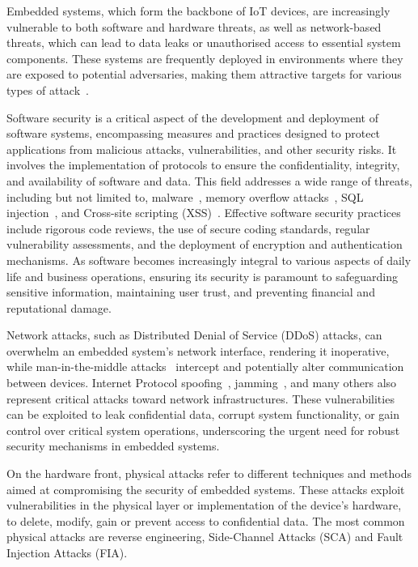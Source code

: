 Embedded systems, which form the backbone of IoT devices, are increasingly vulnerable to both software and hardware threats, as well as network-based threats, which can lead to data leaks or unauthorised access to essential system components. These systems are frequently deployed in environments where they are exposed to potential adversaries, making them attractive targets for various types of attack~\cite{MW-19-compnet, EAJJMB-22-compscrev}.

Software security is a critical aspect of the development and deployment of software systems, encompassing measures and practices designed to protect applications from malicious attacks, vulnerabilities, and other security risks. It involves the implementation of protocols to ensure the confidentiality, integrity, and availability of software and data. This field addresses a wide range of threats, including but not limited to, malware~\cite{FIMI-23-access}, memory overflow attacks~\cite{CWCBW-00-discex}, SQL injection~\cite{DGWKU-16-notere}, and Cross-site scripting (XSS)~\cite{ST-12-computer}. Effective software security practices include rigorous code reviews, the use of secure coding standards, regular vulnerability assessments, and the deployment of encryption and authentication mechanisms. As software becomes increasingly integral to various aspects of daily life and business operations, ensuring its security is paramount to safeguarding sensitive information, maintaining user trust, and preventing financial and reputational damage.

Network attacks, such as Distributed Denial of Service (DDoS) attacks, can overwhelm an embedded system's network interface, rendering it inoperative, while man-in-the-middle attacks~\cite{CDL-16-commsurtuto} intercept and potentially alter communication between devices. Internet Protocol spoofing~\cite{MRT-10-isf}, jamming~\cite{PZ-22-commsurtuto}, and many others also represent critical attacks toward network infrastructures. These vulnerabilities can be exploited to leak confidential data, corrupt system functionality, or gain control over critical system operations, underscoring the urgent need for robust security mechanisms in embedded systems.

On the hardware front, physical attacks refer to different techniques and methods aimed at compromising the security of embedded systems. These attacks exploit vulnerabilities in the physical layer or implementation of the device’s hardware, to delete, modify, gain or prevent access to confidential data.
The most common physical attacks are reverse engineering, Side-Channel Attacks (SCA) and Fault Injection Attacks (FIA).

